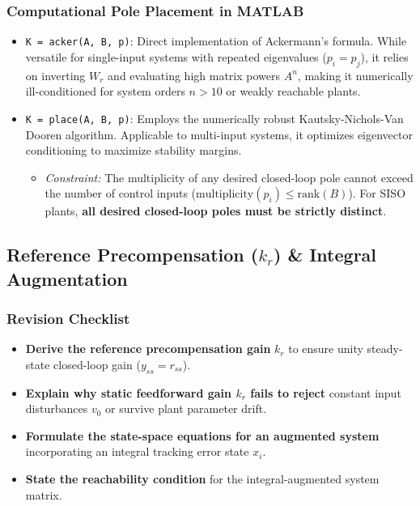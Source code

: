 \documentclass[12pt,onecolumn,twoside ]{article}
\begin{document}
	\subsubsection{Computational Pole Placement in MATLAB}
	\begin{itemize}
		\item
		\texttt{K = acker(A, B, p)}: Direct implementation of Ackermann's formula. While versatile for single-input systems with repeated eigenvalues ($p_i = p_j$), it relies on inverting $W_r$ and evaluating high matrix powers $A^n$, making it numerically ill-conditioned for system orders $n > 10$ or weakly reachable plants.
		\item
		\texttt{K = place(A, B, p)}: Employs the numerically robust Kautsky-Nichols-Van Dooren algorithm. Applicable to multi-input systems, it optimizes eigenvector conditioning to maximize stability margins.
		\begin{itemize}
			\item
			\textit{Constraint:} The multiplicity of any desired closed-loop pole cannot exceed the number of control inputs ($\text{multiplicity}(p_i) \le \text{rank}(B)$). For SISO plants, \textbf{all desired closed-loop poles must be strictly distinct}.
		\end{itemize}
	\end{itemize}
	
	\subsection{Reference Precompensation ($k_r$) \& Integral Augmentation}
	\subsubsection{Revision Checklist}
	\begin{itemize}
		\item[$\square$]
		\textbf{Derive the reference precompensation gain} $k_r$ to ensure unity steady-state closed-loop gain ($y_{ss} = r_{ss}$).
		\item[$\square$]
		\textbf{Explain why static feedforward gain $k_r$ fails to reject} constant input disturbances $v_0$ or survive plant parameter drift.
		\item[$\square$]
		\textbf{Formulate the state-space equations for an augmented system} incorporating an integral tracking error state $x_i$.
		\item[$\square$]
		\textbf{State the reachability condition} for the integral-augmented system matrix.
	\end{itemize}
	
\end{document}
